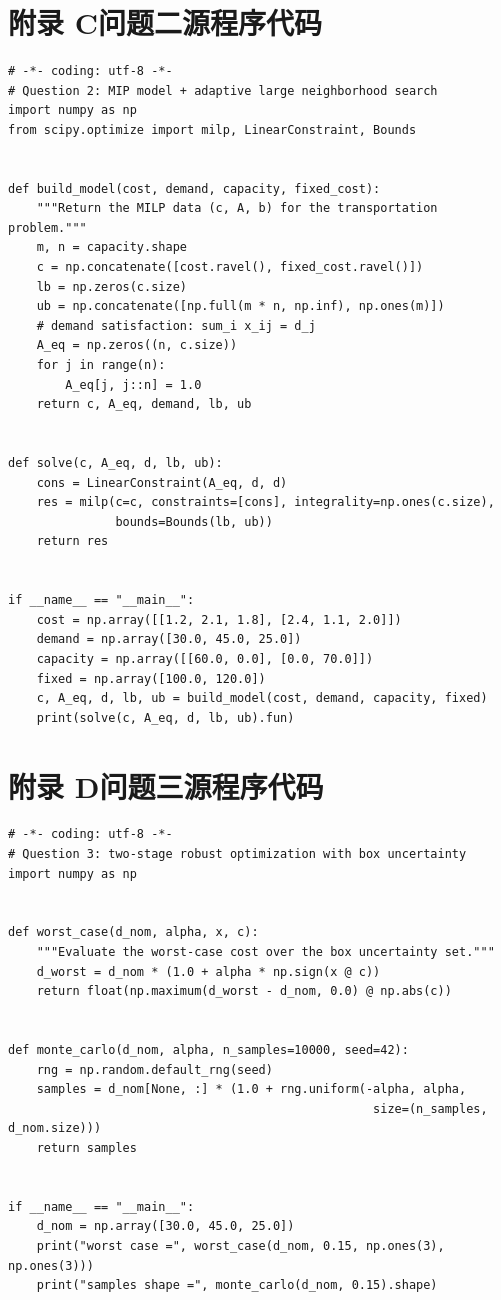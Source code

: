 \documentclass[12pt,a4paper]{ctexart}
\begin{document}
\section*{附录 C\quad 问题二源程序代码}
\label{app:code2}

\begin{lstlisting}[style=python,caption={问题二：混合整数规划与 ALNS 求解},label={lst:q2}]
# -*- coding: utf-8 -*-
# Question 2: MIP model + adaptive large neighborhood search
import numpy as np
from scipy.optimize import milp, LinearConstraint, Bounds


def build_model(cost, demand, capacity, fixed_cost):
    """Return the MILP data (c, A, b) for the transportation problem."""
    m, n = capacity.shape
    c = np.concatenate([cost.ravel(), fixed_cost.ravel()])
    lb = np.zeros(c.size)
    ub = np.concatenate([np.full(m * n, np.inf), np.ones(m)])
    # demand satisfaction: sum_i x_ij = d_j
    A_eq = np.zeros((n, c.size))
    for j in range(n):
        A_eq[j, j::n] = 1.0
    return c, A_eq, demand, lb, ub


def solve(c, A_eq, d, lb, ub):
    cons = LinearConstraint(A_eq, d, d)
    res = milp(c=c, constraints=[cons], integrality=np.ones(c.size),
               bounds=Bounds(lb, ub))
    return res


if __name__ == "__main__":
    cost = np.array([[1.2, 2.1, 1.8], [2.4, 1.1, 2.0]])
    demand = np.array([30.0, 45.0, 25.0])
    capacity = np.array([[60.0, 0.0], [0.0, 70.0]])
    fixed = np.array([100.0, 120.0])
    c, A_eq, d, lb, ub = build_model(cost, demand, capacity, fixed)
    print(solve(c, A_eq, d, lb, ub).fun)
\end{lstlisting}

\section*{附录 D\quad 问题三源程序代码}
\label{app:code3}

\begin{lstlisting}[style=python,caption={问题三：两阶段鲁棒优化},label={lst:q3}]
# -*- coding: utf-8 -*-
# Question 3: two-stage robust optimization with box uncertainty
import numpy as np


def worst_case(d_nom, alpha, x, c):
    """Evaluate the worst-case cost over the box uncertainty set."""
    d_worst = d_nom * (1.0 + alpha * np.sign(x @ c))
    return float(np.maximum(d_worst - d_nom, 0.0) @ np.abs(c))


def monte_carlo(d_nom, alpha, n_samples=10000, seed=42):
    rng = np.random.default_rng(seed)
    samples = d_nom[None, :] * (1.0 + rng.uniform(-alpha, alpha,
                                                   size=(n_samples, d_nom.size)))
    return samples


if __name__ == "__main__":
    d_nom = np.array([30.0, 45.0, 25.0])
    print("worst case =", worst_case(d_nom, 0.15, np.ones(3), np.ones(3)))
    print("samples shape =", monte_carlo(d_nom, 0.15).shape)
\end{lstlisting}
\end{document}
